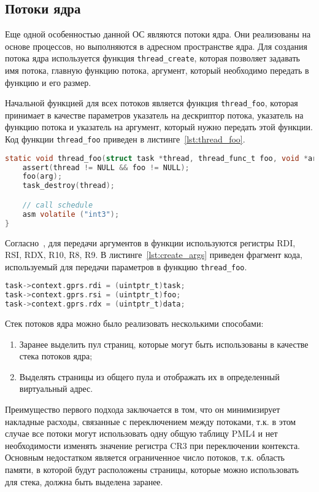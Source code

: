 \subsection{Потоки ядра}
Еще одной особенностью данной ОС являются потоки ядра. Они реализованы на основе процессов, но
выполняются в адресном пространстве ядра. Для создания потока ядра используется функция \texttt{thread\_create},
которая позволяет задавать имя потока, главную функцию потока, аргумент, который необходимо передать в функцию
и его размер.

Начальной функцией для всех потоков является функция \texttt{thread\_foo}, которая принимает в качестве
параметров указатель на дескриптор потока, указатель на функцию потока и указатель на аргумент, который
нужно передать этой функции. Код функции \texttt{thread\_foo} приведен в листинге~\ref{lst:thread_foo}.

\begin{lstlisting}[language=C,
caption={Точка входа потоков ядра},
label={lst:thread_foo}]
static void thread_foo(struct task *thread, thread_func_t foo, void *arg) {
	assert(thread != NULL && foo != NULL);
	foo(arg);
	task_destroy(thread);

	// call schedule
	asm volatile ("int3");
}
\end{lstlisting}

Согласно~\cite{x86_64_abi}, для передачи аргументов в функции используются регистры RDI, RSI, RDX, R10, R8, R9.
В листинге~\ref{lst:create_args} приведен фрагмент кода, используемый для передачи параметров в функцию \texttt{thread\_foo}.

\begin{lstlisting}[language=C,
caption={Передача параметров в функцию \texttt{thread\_foo}},
label={lst:create_args}]
task->context.gprs.rdi = (uintptr_t)task;
task->context.gprs.rsi = (uintptr_t)foo;
task->context.gprs.rdx = (uintptr_t)data;
\end{lstlisting}

Стек потоков ядра можно было реализовать несколькими способами:
\begin{enumerate}[1.]
\item Заранее выделить пул страниц, которые могут быть использованы в качестве стека потоков ядра;
\item Выделять страницы из общего пула и отображать их в определенный виртуальный адрес.
\end{enumerate}

Преимущество первого подхода заключается в том, что он минимизирует накладные расходы, связанные
с переключением между потоками, т.к. в этом случае все потоки могут использовать одну общую таблицу
PML4 и нет необходимости изменять значение регистра CR3 при переключении контекста. Основным
недостатком является ограниченное число потоков, т.к. область памяти, в которой будут расположены страницы,
которые можно использовать для стека, должна быть выделена заранее.

